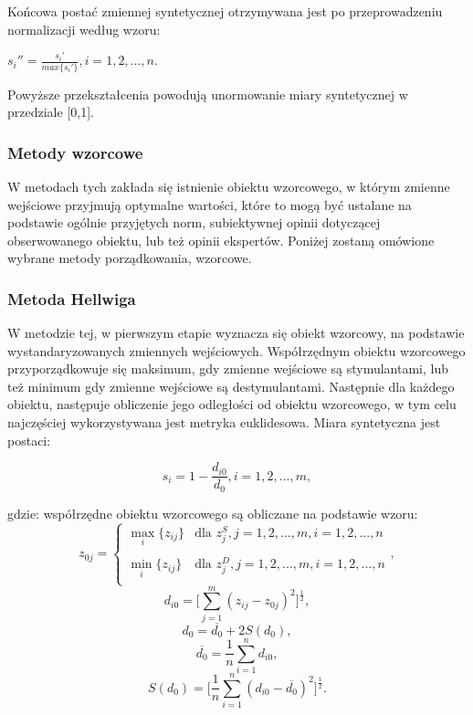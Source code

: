\documentclass[12pt,a4paper]{report}
\begin{document}
Końcowa postać zmiennej syntetycznej otrzymywana jest po przeprowadzeniu normalizacji według wzoru:
\begin{center}
$s_{i}''=\frac{s_{i}'}{max\{s_{i}'\}}, i=1, 2, ..., n$.\\
\end{center}
Powyższe przekształcenia powodują unormowanie miary syntetycznej w przedziale [0,1].
\newpage

\subsubsection{Metody wzorcowe}
\noindent

W metodach tych zakłada się istnienie obiektu wzorcowego, w którym zmienne wejściowe przyjmują optymalne wartości, które to mogą być ustalane na podstawie ogólnie przyjętych norm, subiektywnej opinii dotyczącej obserwowanego obiektu, lub też opinii ekspertów. Poniżej zostaną omówione wybrane metody porządkowania, wzorcowe.

\subsubsection{Metoda Hellwiga}
\noindent

W metodzie tej, w pierwszym etapie wyznacza się obiekt wzorcowy, na podstawie wystandaryzowanych zmiennych wejściowych. Współrzędnym obiektu wzorcowego przyporządkowuje się maksimum, gdy zmienne wejściowe są stymulantami, lub też minimum gdy zmienne wejściowe są destymulantami. Następnie dla każdego obiektu, następuje obliczenie jego odległości od obiektu wzorcowego, w tym celu najczęściej wykorzystywana jest metryka euklidesowa. 
Miara syntetyczna jest postaci: 
\begin{center}
$$s_i=1-\frac{d_{i0}}{d_{0}}, i=1, 2, ..., m ,$$
\end{center}
gdzie:
\newline
współrzędne obiektu wzorcowego są obliczane na podstawie wzoru:
$$z_{0j}=\left\{ \begin{array}{ll}
\max\limits_{i} \{z_{ij}\} & \textrm{dla  } z_{j}^S, j=1,2,...,m, i=1,2,...,n\\\\
\min\limits_{i} \{z_{ij}\} & \textrm{dla } z_{j}^D, j=1,2,...,m, i=1,2,...,n\\
\end{array} \right., $$
$$d_{i0}=\bigg[\sum_{j=1}^{m} (z_{ij} - z_{0j})^2 \bigg]^\frac{1}{2} ,$$ 
$$d_{0}=\overline{d_{0}} + 2S(d_{0}) ,$$
$$\overline{d_{0}}=\frac{1}{n}\sum_{i=1}^{n} d_{i0} ,$$
$$S(d_{0})=\bigg[\frac{1}{n}\sum_{i=1}^{n} (d_{i0}-\overline{d_{0}})^2 \bigg]^\frac{1}{2} .$$
\end{document}
